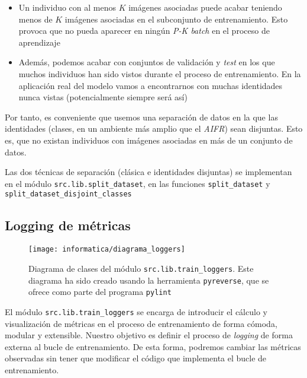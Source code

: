 \begin{itemize}
    \item Un individuo con al menos $K$ imágenes asociadas puede acabar teniendo menos de $K$ imágenes asociadas en el subconjunto de entrenamiento. Esto provoca que no pueda aparecer en ningún \textit{P-K batch} en el proceso de aprendizaje
    \item Además, podemos acabar con conjuntos de validación y \textit{test} en los que muchos individuos han sido vistos durante el proceso de entrenamiento. En la aplicación real del modelo vamos a encontrarnos con muchas identidades nunca vistas (potencialmente siempre será así)
\end{itemize}

Por tanto, es conveniente que usemos una separación de datos en la que las identidades (clases, en un ambiente más amplio que el \textit{AIFR}) sean disjuntas. Esto es, que no existan individuos con imágenes asociadas en más de un conjunto de datos.

Las dos técnicas de separación (clásica e identidades disjuntas) se implementan en el módulo \lstinline{src.lib.split_dataset}, en las funciones \lstinline{split_dataset} y \lstinline{split_dataset_disjoint_classes}

\subsection{Logging de métricas} \label{isec:loggin_metricas}

\begin{figure}[H]
    \centering
    \texttt{[image: informatica/diagrama\_loggers]}
    \caption{Diagrama de clases del módulo \lstinline{src.lib.train_loggers}. Este diagrama ha sido creado usando la herramienta \lstinline{pyreverse}, que se ofrece como parte del programa \lstinline{pylint}}
    \label{img:diagrama_clases_loggers}
\end{figure}

El módulo \lstinline{src.lib.train_loggers} se encarga de introducir el cálculo y visualización de métricas en el proceso de entrenamiento de forma cómoda, modular y extensible. Nuestro objetivo es definir el proceso de \textit{logging} de forma externa al bucle de entrenamiento. De esta forma, podremos cambiar las métricas observadas sin tener que modificar el código que implementa el bucle de entrenamiento.

